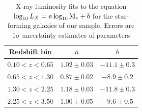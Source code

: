 %
%
\begin{table}
\caption{X-ray luminosity fits to the equation $\log_{10}L_X=a\log_{10}{\rm M}_*+ b$ for the star-forming galaxies of our sample. Errors are $1\sigma$ uncertainty estimates of parameters}             %
\label{table:lx_fitpar}      %
\centering                          %
\begin{tabular}{c c c }        %
\hline\hline                 %
Redshift bin  & $a$               & $b$       \\    %
\hline                        %
$0.10<z<0.65$ & $ 1.02 \pm 0.03 $ & $-11.1 \pm 0.3$ \\
$0.65<z<1.30$ & $ 0.87 \pm 0.02 $ & $ -8.9 \pm 0.2$ \\
$1.30<z<2.25$ & $ 1.18 \pm 0.03 $ & $-11.8 \pm 0.3$ \\
$2.25<z<3.50$ & $ 1.00 \pm 0.05 $ & $ -9.6 \pm 0.5$ \\
\hline                                   %
\end{tabular}

\end{table}

